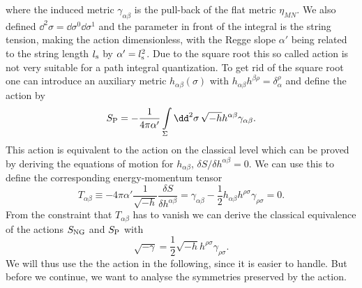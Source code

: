 %
%
where the induced metric $\gamma_{\alpha\beta}$ is the pull-back of the flat  metric $\eta_{MN}$. We also defined $\dd^{2}\sigma = \dd\sigma^{0}\dd\sigma^{1}$ and the parameter in front of the integral is the string tension, making the action dimensionless, with the Regge slope $\alpha'$ being related to the string length $l_{\rm s}$ by $\alpha'=l_{\rm s}^{2}$. Due to the square root this so called  action is not very suitable for a path integral quantization. To get rid of the square root one can introduce an auxiliary metric $h_{\alpha\beta}(\sigma)$ with $h_{\alpha\beta}h^{\beta\rho}=\delta_{\alpha}^{\rho}$ and define the  action by
%
%
\begin{equation}
S_{\rm P} = -\frac{1}{4\pi\alpha'} \int\limits_{\Sigma}\dd^{2}\sigma\, \sqrt{-h}h^{\alpha\beta}\gamma_{\alpha\beta}.
\end{equation}
%
%
This action is equivalent to the  action on the classical level which can be proved by deriving the equations of motion for $h_{\alpha\beta}$, $\delta S/ \delta h^{\alpha\beta} = 0$. We can use this to define the corresponding energy-momentum tensor
%
%
\begin{equation}
T_{\alpha\beta} \equiv -4\pi\alpha' \frac{1}{\sqrt{-h}} \frac{\delta S}{\delta h^{\alpha\beta}} = \gamma_{\alpha\beta} - \frac{1}{2} h_{\alpha\beta} h^{\rho\sigma}\gamma_{\rho\sigma} = 0.
\end{equation}
%
%
From the constraint that $T_{\alpha\beta}$ has to vanish we can derive the classical equivalence of the actions $S_{\rm NG}$ and $S_{\rm P}$ with
%
%
\begin{equation}
\sqrt{-\gamma} = \frac{1}{2} \sqrt{-h} h^{\rho\sigma} \gamma_{\rho\sigma}.
\end{equation}
%
%
We will thus use the the  action in the following, since it is easier to handle. But before we continue, we want to analyse the symmetries preserved by the  action.
%
%
